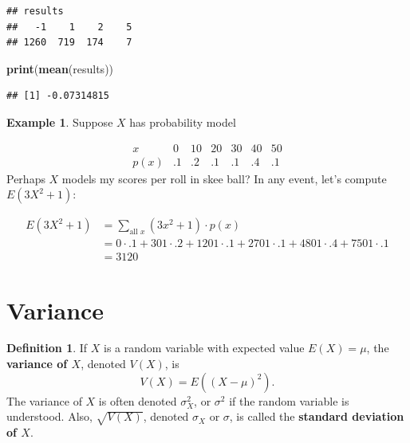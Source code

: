 \documentclass[
]{book}
\newenvironment{Shaded}{\begin{snugshade}}{\end{snugshade}}
\newcommand{\FunctionTok}[1]{\textcolor[rgb]{0.13,0.29,0.53}{\textbf{#1}}}
\newcommand{\NormalTok}[1]{#1}
\theoremstyle{definition}
\newtheorem{definition}{Definition}[chapter]
\theoremstyle{definition}
\newtheorem{example}{Example}[chapter]
\theoremstyle{definition}
\theoremstyle{definition}
\theoremstyle{remark}
\begin{document}
\begin{verbatim}
## results
##   -1    1    2    5 
## 1260  719  174    7
\end{verbatim}

\begin{Shaded}
\begin{Highlighting}[]
\FunctionTok{print}\NormalTok{(}\FunctionTok{mean}\NormalTok{(results))}
\end{Highlighting}
\end{Shaded}

\begin{verbatim}
## [1] -0.07314815
\end{verbatim}

\begin{example}
Suppose \(X\) has probability model

\[
\begin{array}{c|c|c|c|c|c|c}
x & 0 & 10 & 20 & 30 & 40 & 50\\ \hline
p(x) & .1 & .2 & .1 & .1 & .4 & .1  
\end{array}
\]
Perhaps \(X\) models my scores per roll in skee ball? In any event, let's compute \(E(3X^2 + 1)\):

\begin{align*}
E(3X^2 + 1) &= \sum_{\text{all }x} (3x^2 + 1)\cdot p(x)\\
&= 0 \cdot .1 + 301\cdot .2 + 1201\cdot .1 + 2701 \cdot .1 + 4801 \cdot .4 + 7501 \cdot .1\\
&= 3120
\end{align*}
\end{example}

\section{Variance}\label{variance}

\begin{definition}
\protect\hypertarget{def:variance-discrete}{}\label{def:variance-discrete}If \(X\) is a random variable with expected value \(E(X) = \mu\), the \textbf{variance of \(X\)}, denoted \(V(X)\), is \[V(X) = E((X-\mu)^2).\]
The variance of \(X\) is often denoted \(\sigma^2_X\), or \(\sigma^2\) if the random variable is understood. Also, \(\sqrt{V(X)}\), denoted \(\sigma_X\) or \(\sigma\), is called the \textbf{standard deviation of \(X\)}.
\end{definition}
\end{document}
